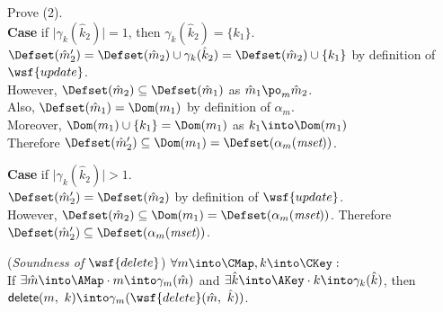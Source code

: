 \begin{itemize}
Prove (2).\\
\textbf{Case} if $\mid \gamma_k(\hat{k}_2) \mid = 1$, then $\gamma_k(\hat{k}_2) = \{ k_1 \}$.\\
$\Defset(\hat{m}_2') = \Defset(\hat{m}_2) \cup \gamma_k(\hat{k}_2)
= \Defset(\hat{m}_2) \cup \{ k_1 \}$ by definition of $\wsf{update}$.\\
However, $\Defset(\hat{m}_2) \subseteq \Defset(\hat{m}_1)$ as $\hat{m}_1 \po_m \hat{m}_2$.\\
Also, $\Defset(\hat{m}_1) = \Dom(m_1)$ by definition of $\alpha_m$.\\
Moreover, $\Dom(m_1) \cup \{ k_1 \} = \Dom(m_1)$ as $k_1 \into \Dom(m_1)$ \\
Therefore $\Defset(\hat{m}_2') \subseteq \Dom(m_1) = \Defset(\alpha_m(\emph{mset}))$.

\textbf{Case} if $\mid \gamma_k(\hat{k}_2) \mid > 1$.\\
$\Defset(\hat{m}_2') = \Defset(\hat{m}_2)$ by definition of $\wsf{update}$.\\
However, $\Defset(\hat{m}_2) \subseteq \Dom(m_1) = \Defset(\alpha_m(\emph{mset}))$.
Therefore $\Defset(\hat{m}_2') \subseteq \Defset(\alpha_m(\emph{mset}))$.
\end{itemize}


\begin{thm} \normalfont
(\textit{Soundness of} $\wsf{delete}$) 
$\forall m \into \CMap, k \into \CKey :$\\
If $\exists \hat{m} \into \AMap \cdot m \into \gamma_m(\hat{m})$
and $\exists \hat{k} \into \AKey \cdot k \into \gamma_k(\hat{k})$,
then $\textsf{delete}(m,\ k) \into \gamma_m(\wsf{delete}(\hat{m},\ \hat{k}))$.
\end{thm}
